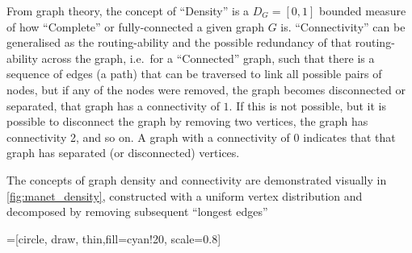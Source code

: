 From graph theory, the concept of ``Density'' is a $D_G=[0,1]$ bounded measure of how ``Complete'' or fully-connected a given graph $G$ is.
``Connectivity'' can be generalised as the routing-ability and the possible redundancy of that routing-ability across the graph, i.e.\ for a ``Connected'' graph, such that there is a sequence of edges (a path) that can be traversed to link all possible pairs of nodes, but if any of the nodes were removed, the graph becomes disconnected or separated, that graph has a connectivity of $1$.
If this is not possible, but it is possible to disconnect the graph by removing two vertices, the graph has connectivity 2, and so on.
A graph with a connectivity of $0$ indicates that that graph has separated (or disconnected) vertices.

The concepts of graph density and connectivity are demonstrated visually in \autoref{fig:manet_density}, constructed with a uniform vertex distribution and decomposed by removing subsequent ``longest edges''

=[circle, draw, thin,fill=cyan!20, scale=0.8]

